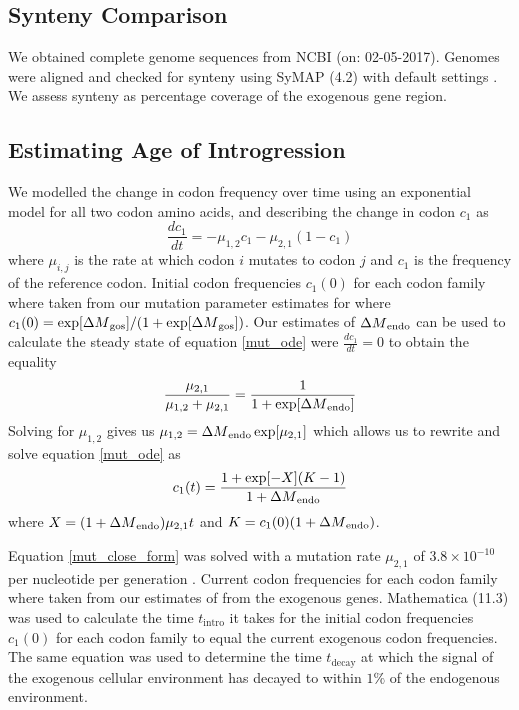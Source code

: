 \documentclass[fleqn,letterpaper]{article}
\begin{document}
\subsection*{Synteny Comparison}
We obtained complete genome sequences from NCBI (on: 02-05-2017).
Genomes were aligned and checked for synteny using SyMAP (4.2) with default settings \citep{soderlund2006, soderlund2011}.
We assess synteny as percentage coverage of the exogenous gene region.

\subsection*{Estimating Age of Introgression}
We modelled the change in codon frequency over time using an exponential model for all two codon amino acids, and describing the change in codon $c_1$ as
\begin{equation}
\frac{d c_1}{d t} = -\mu_{1,2}c_1 - \mu_{2,1}(1-c_1)
\label{mut_ode}
\end{equation}
where $\mu_{i,j}$ is the rate at which codon $i$ mutates to codon $j$ and $c_1$ is the frequency of the reference codon.
Initial codon frequencies $c_1(0)$ for each codon family where taken from our mutation parameter estimates for \gossypii where $c_1(0) = \exp[{\Delta M}_\text{gos}]/(1+\exp[{\Delta M}_\text{gos}])$. 
Our estimates of ${\Delta M}_\text{endo}$ can be used to calculate the steady state of equation \ref{mut_ode} were $\frac{d c_1}{d t} = 0$ to obtain the equality
\begin{equation}
\frac{\mu_{2,1}}{\mu_{1,2} + \mu_{2,1}} = \frac{1}{1+\exp[{\Delta M}_\text{endo}]}
\end{equation}
Solving for $\mu_{1,2}$ gives us $\mu_{1,2} = {\Delta M}_\text{endo}\exp[\mu_{2,1}]$ which allows us to rewrite and solve equation \ref{mut_ode} as
\begin{equation}
c_1(t) = \frac{ 1 + \exp[-X](K-1) }{ 1+{\Delta M}_\text{endo} }
\label{mut_close_form}
\end{equation}
where $X = (1+{\Delta M}_\text{endo})\mu_{2,1}t$ and $K = c_1(0)(1+{\Delta M}_\text{endo}) $.

Equation \ref{mut_close_form} was solved with a mutation rate $\mu_{2,1}$ of $3.8\times 10^{-10}$ per nucleotide per generation \citep{lang2008}. 
Current codon frequencies for each codon family where taken from our estimates of \DM from the exogenous genes.
Mathematica (11.3) \citep{Mathematica11} was used to calculate the time $t_\text{intro}$ it takes for the initial codon frequencies $c_1(0)$ for each codon family to equal the current exogenous codon frequencies.
The same equation was used to determine the time $t_\text{decay}$ at which the signal of the exogenous cellular environment has decayed to within $1 \%$ of the endogenous environment.
\end{document}

